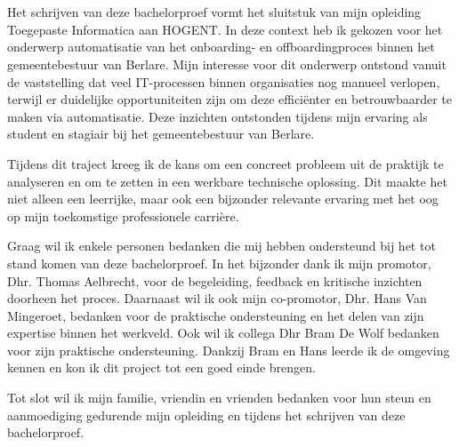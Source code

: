 
\chapter*{}%
\label{ch:voorwoord}


Het schrijven van deze bachelorproef vormt het sluitstuk van mijn opleiding Toegepaste Informatica aan HOGENT. In deze context heb ik gekozen voor het onderwerp automatisatie van het onboarding- en offboardingproces binnen het gemeentebestuur van Berlare. Mijn interesse voor dit onderwerp ontstond vanuit de vaststelling dat veel IT-processen binnen organisaties nog manueel verlopen, terwijl er duidelijke opportuniteiten zijn om deze efficiënter en betrouwbaarder te maken via automatisatie. Deze inzichten ontstonden tijdens mijn ervaring als student en stagiair bij het gemeentebestuur van Berlare. \newline

Tijdens dit traject kreeg ik de kans om een concreet probleem uit de praktijk te analyseren en om te zetten in een werkbare technische oplossing. Dit maakte het niet alleen een leerrijke, maar ook een bijzonder relevante ervaring met het oog op mijn toekomstige professionele carrière.\newline

Graag wil ik enkele personen bedanken die mij hebben ondersteund bij het tot stand komen van deze bachelorproef. In het bijzonder dank ik mijn promotor, Dhr. Thomas Aelbrecht, voor de begeleiding, feedback en kritische inzichten doorheen het proces. Daarnaast wil ik ook mijn co-promotor, Dhr. Hans Van Mingeroet, bedanken voor de praktische ondersteuning en het delen van zijn expertise binnen het werkveld. Ook wil ik collega Dhr Bram De Wolf bedanken voor zijn praktische ondersteuning. Dankzij Bram en Hans leerde ik de omgeving kennen en kon ik dit project tot een goed einde brengen. \newline

Tot slot wil ik mijn familie, vriendin en vrienden bedanken voor hun steun en aanmoediging gedurende mijn opleiding en tijdens het schrijven van deze bachelorproef.\newline